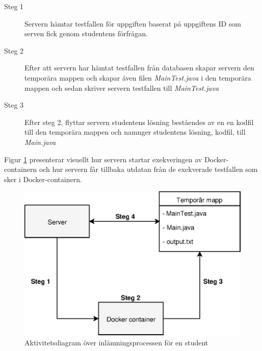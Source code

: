 \documentclass[a4paper,11pt]{article}
\begin{document}
{\begin{description}
    \item [Steg 1] Servern hämtar testfallen för uppgiften baserat på uppgiftens ID som serven fick genom studentens förfrågan.
    \item [Steg 2] Efter att servern har hämtat testfallen från databasen skapar servern den temporära mappen och skapar även filen \textit{MainTest.java} i den temporära mappen och sedan skriver servern testfallen till \textit{MainTest.java}
    \item [Steg 3] Efter steg 2, flyttar servern studentens lösning beståendes av en en kodfil till den temporära mappen och namnger studentens lösning, kodfil, till \textit{Main.java}
\end{description}

\newpage
Figur \ref{fig:leapTeknisk2} presenterar visuellt hur servern startar exekveringen av Docker-containern och hur servern får tillbaka utdatan från de exekverade testfallen som sker i Docker-containern.

\begin{figure}[ht!]
\centering
\includegraphics[scale=0.8]{leap_teknisk_2.eps}
\caption{Aktivitetsdiagram över inlämningsprocessen för en student}
\label{fig:leapTeknisk2}
\end{figure}

}
\end{document}
